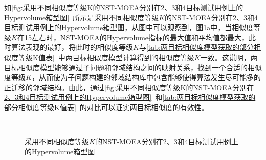\par
如\autoref{fig:采用不同相似度等级K的NST-MOEA分别在2、3和4目标测试用例上的Hypervolume箱型图}~所示是采用不同相似度等级$K$的NST-MOEA分别在2、3和4目标测试用例上的Hypervolume箱型图，从图中可以观察到，图1a中，当相似度等级$K$在15左右时，NST-MOEA的Hypervolume指标的最大值和平均值都最大，此时算法表现的最好，将此时的相似度等级$K$与\autoref{tab:两目标相似度模型获取的部分相似度等级K值表}~中两目标相似度模型计算得到的相似度等级$K$一致。这说明，两目标相似度模型能够通过子问题和邻域结构之间的映射关系，找到一个合适的相似度等级$K$，从而使为子问题构建的邻域结构库中包含能够使得算法发生尽可能多的正迁移的邻域结构。由此，通过\autoref{fig:采用不同相似度等级K的NST-MOEA分别在2、3和4目标测试用例上的Hypervolume箱型图}~和\autoref{tab:两目标相似度模型获取的部分相似度等级K值表}~的对比可以证实两目标相似度的有效性。
\begin{figure}[!h]
     \quad
    \\
     \quad
    \caption[采用不同相似度等级$K$的NST-MOEA分别在2、3和4目标测试用例上的Hypervolume箱型图]{采用不同相似度等级$K$的NST-MOEA分别在2、3和4目标测试用例上的Hypervolume箱型图}
    \label{fig:采用不同相似度等级K的NST-MOEA分别在2、3和4目标测试用例上的Hypervolume箱型图}
\end{figure}

